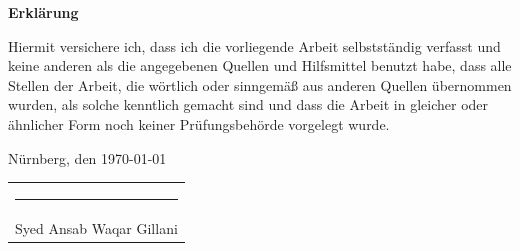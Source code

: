 \documentclass[12pt,oneside,reqno,a4paper]{article}
\begin{document}
\begin{otherlanguage}{ngerman}
\begin{center}\textbf{\large Erklärung}\end{center}

\noindent
Hiermit versichere ich, dass ich die vorliegende Arbeit selbstständig verfasst
und keine anderen als die angegebenen Quellen und Hilfsmittel benutzt habe,
dass alle Stellen der Arbeit, die wörtlich oder sinngemäß aus anderen Quellen
übernommen wurden, als solche kenntlich gemacht sind und dass die Arbeit in
gleicher oder ähnlicher Form noch keiner Prüfungsbehörde vorgelegt wurde.

\vspace{4\baselineskip}

\noindent
Nürnberg, den \today \hfill
\begin{tabular}[t]{@{}c@{}}
  \rule{6cm}{0.4pt}\\
  Syed Ansab Waqar Gillani
\end{tabular}
\end{otherlanguage}
\end{document}
